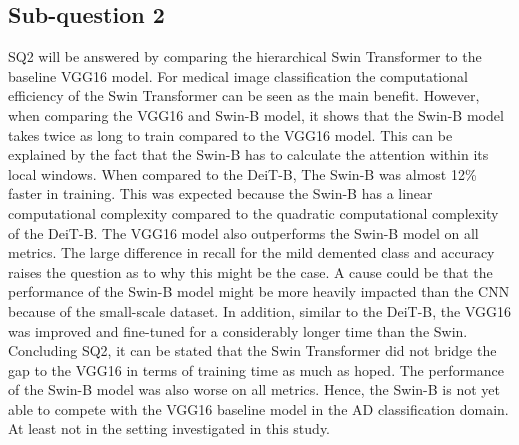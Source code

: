 \documentclass[11pt, a4paper]{article}
\begin{document}
\subsection{Sub-question 2} \label{subs:sq2}
SQ2 will be answered by comparing the hierarchical Swin Transformer \cite{Liu2021SwinWindows} to the baseline VGG16 model. For medical image classification the computational efficiency of the Swin Transformer can be seen as the main benefit. However, when comparing the VGG16 and Swin-B model, it shows that the Swin-B model takes twice as long to train compared to the VGG16 model. This can be explained by the fact that the Swin-B has to calculate the attention within its local windows. When compared to the DeiT-B, The Swin-B was almost 12\% faster in training. This was expected because the Swin-B has a linear computational complexity compared to the quadratic computational complexity of the DeiT-B. The VGG16 model also outperforms the Swin-B model on all metrics. The large difference in recall for the mild demented class and accuracy raises the question as to why this might be the case. A cause could be that the performance of the Swin-B model might be more heavily impacted than the CNN because of the small-scale dataset. In addition, similar to the DeiT-B, the VGG16 was improved and fine-tuned for a considerably longer time than the Swin. Concluding SQ2, it can be stated that the Swin Transformer did not bridge the gap to the VGG16 in terms of training time as much as hoped. The performance of the Swin-B model was also worse on all metrics. Hence, the Swin-B is not yet able to compete with the VGG16 baseline model in the AD classification domain. At least not in the setting investigated in this study.
\end{document}
